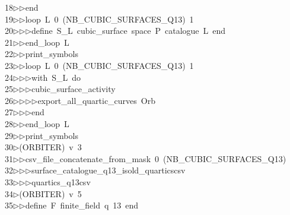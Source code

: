 \begin{tabbing}
18\>$\triangleright$\>$\triangleright$\>end\ \\[0pt]
19\>$\triangleright$\>$\triangleright$\>loop\ L\ 0\ (NB\_CUBIC\_SURFACES\_Q13)\ 1\ \\[0pt]
20\>$\triangleright$\>$\triangleright$\>$\triangleright$\>define\ S\_L\ cubic\_surface\ space\ P\ catalogue\ L\ end\ \\[0pt]
21\>$\triangleright$\>$\triangleright$\>end\_loop\ L\ \\[0pt]
22\>$\triangleright$\>$\triangleright$\>print\_symbols\ \\[0pt]
23\>$\triangleright$\>$\triangleright$\>loop\ L\ 0\ (NB\_CUBIC\_SURFACES\_Q13)\ 1\ \\[0pt]
24\>$\triangleright$\>$\triangleright$\>$\triangleright$\>with\ S\_L\ do\ \\[0pt]
25\>$\triangleright$\>$\triangleright$\>$\triangleright$\>cubic\_surface\_activity\ \\[0pt]
26\>$\triangleright$\>$\triangleright$\>$\triangleright$\>$\triangleright$\>export\_all\_quartic\_curves\ Orb\ \\[0pt]
27\>$\triangleright$\>$\triangleright$\>$\triangleright$\>end\ \\[0pt]
28\>$\triangleright$\>$\triangleright$\>end\_loop\ L\ \\[0pt]
29\>$\triangleright$\>$\triangleright$\>print\_symbols\\[0pt]
30\>$\triangleright$\>(ORBITER)\ v\ 3\ \\[0pt]
31\>$\triangleright$\>$\triangleright$\>csv\_file\_concatenate\_from\_mask\ 0\ (NB\_CUBIC\_SURFACES\_Q13)\ \\[0pt]
32\>$\triangleright$\>$\triangleright$\>$\triangleright$\>surface\_catalogue\_q13\_isold\_quarticscsv\ \\[0pt]
33\>$\triangleright$\>$\triangleright$\>$\triangleright$\>quartics\_q13csv\\[0pt]
34\>$\triangleright$\>(ORBITER)\ v\ 5\ \\[0pt]
35\>$\triangleright$\>$\triangleright$\>define\ F\ finite\_field\ q\ 13\ end\ \\[0pt]

\end{tabbing}
